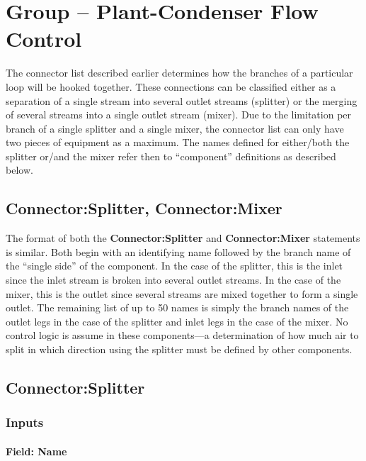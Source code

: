 \section{Group -- Plant-Condenser Flow Control}\label{group-plant-condenser-flow-control}

The connector list described earlier determines how the branches of a particular loop will be hooked together. These connections can be classified either as a separation of a single stream into several outlet streams (splitter) or the merging of several streams into a single outlet stream (mixer). Due to the limitation per branch of a single splitter and a single mixer, the connector list can only have two pieces of equipment as a maximum. The names defined for either/both the splitter or/and the mixer refer then to ``component'' definitions as described below.

\subsection{Connector:Splitter, Connector:Mixer}\label{connectorsplitter-connectormixer}

The format of both the \textbf{Connector:Splitter} and \textbf{Connector:Mixer} statements is similar. Both begin with an identifying name followed by the branch name of the ``single side'' of the component. In the case of the splitter, this is the inlet since the inlet stream is broken into several outlet streams. In the case of the mixer, this is the outlet since several streams are mixed together to form a single outlet. The remaining list of up to 50 names is simply the branch names of the outlet legs in the case of the splitter and inlet legs in the case of the mixer. No control logic is assume in these components---a determination of how much air to split in which direction using the splitter must be defined by other components.

\subsection{Connector:Splitter}\label{connectorsplitter}

\subsubsection{Inputs}\label{inputs-034}

\paragraph{Field: Name}\label{field-name-033}

